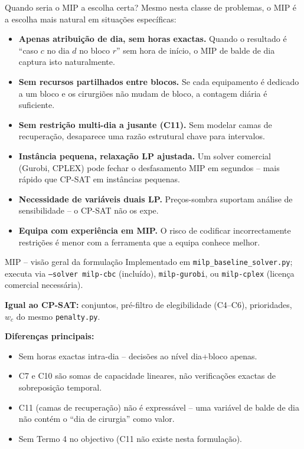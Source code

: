 \documentclass[10pt,aspectratio=169]{beamer}
\newcommand{\bk}{\hfill\hyperlink{toc}{\beamerreturnbutton{Agenda}}}
\begin{document}
\begin{frame}{Quando seria o MIP a escolha certa?}
  \small Mesmo nesta classe de problemas, o MIP \'e a escolha mais
  natural em situa\c{c}\~oes espec\'ificas:
  \begin{itemize}
    \item \textbf{Apenas atribui\c{c}\~ao de dia, sem horas exactas.}
      Quando o resultado \'e ``caso $c$ no dia $d$ no bloco $r$'' sem
      hora de in\'icio, o MIP de balde de dia captura isto naturalmente.
    \item \textbf{Sem recursos partilhados entre blocos.} Se cada
      equipamento \'e dedicado a um bloco e os cirurgi\~oes n\~ao mudam
      de bloco, a contagem di\'aria \'e suficiente.
    \item \textbf{Sem restri\c{c}\~ao multi-dia a jusante (C11).} Sem
      modelar camas de recupera\c{c}\~ao, desaparece uma raz\~ao
      estrutural chave para intervalos.
    \item \textbf{Inst\^ancia pequena, relaxa\c{c}\~ao LP ajustada.}
      Um solver comercial (Gurobi, CPLEX) pode fechar o desfasamento
      MIP em segundos -- mais r\'apido que CP-SAT em inst\^ancias
      pequenas.
    \item \textbf{Necessidade de vari\'aveis duais LP.} Pre\c{c}os-sombra
      suportam an\'alise de sensibilidade -- o CP-SAT n\~ao os expe.
    \item \textbf{Equipa com experi\^encia em MIP.} O risco de codificar
      incorrectamente restri\c{c}\~oes \'e menor com a ferramenta
      que a equipa conhece melhor.
  \end{itemize}
  \bk
\end{frame}

\begin{frame}{MIP -- vis\~ao geral da formula\c{c}\~ao}
  \hypertarget{mip1}{}
  Implementado em \texttt{milp\_baseline\_solver.py}; executa via
  \texttt{--solver milp-cbc} (inclu\'ido), \texttt{milp-gurobi}, ou
  \texttt{milp-cplex} (licen\c{c}a comercial necess\'aria).

  \textbf{Igual ao CP-SAT:} conjuntos, pr\'e-filtro de elegibilidade
  (C4--C6), prioridades, $w_c$ do mesmo \texttt{penalty.py}.

  \textbf{Diferen\c{c}as principais:}
  \begin{itemize}\small
    \item Sem horas exactas intra-dia -- decis\~oes ao n\'ivel
      dia+bloco apenas.
    \item C7 e C10 s\~ao somas de capacidade lineares, n\~ao
      verifica\c{c}\~oes exactas de sobreposi\c{c}\~ao temporal.
    \item C11 (camas de recupera\c{c}\~ao) n\~ao \'e express\'avel --
      uma vari\'avel de balde de dia n\~ao cont\'em o ``dia de
      cirurgia'' como valor.
    \item Sem Termo 4 no objectivo (C11 n\~ao existe nesta formula\c{c}\~ao).
  \end{itemize}
  \bk
\end{frame}
\end{document}
